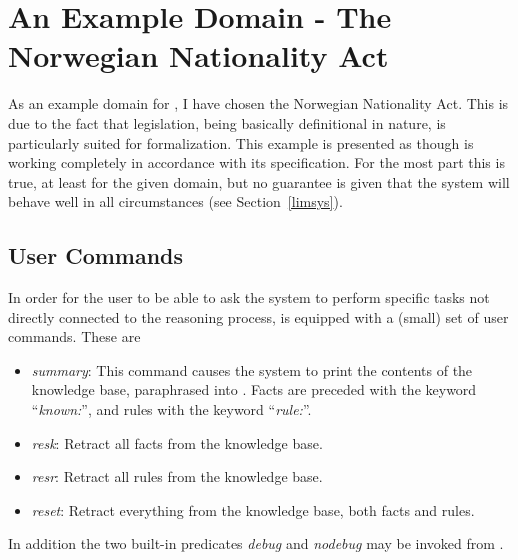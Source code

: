 
\section{An Example Domain - The Norwegian Nationality Act}
\label{example}

As an example domain for {\nash}, I have chosen the Norwegian
Nationality Act. This is due to the fact that legislation, being
basically definitional in nature, is particularly suited for
formalization. This example is presented as though {\nash} is working
completely in accordance with its specification. For the most part
this is true, at least for the given domain, but no guarantee is given
that the system will behave well in all circumstances (see
Section~\ref{limsys}).

\subsection{User Commands}

In order for the user to be able to ask the system to perform specific
tasks not directly connected to the reasoning process, {\nash} is
equipped with a (small) set of user commands. These are

\begin{itemize}
\item {\em summary\/}: This command causes the system to print the
  contents of the knowledge base, paraphrased into {\nal}. Facts are
  preceded with the keyword ``{\sl known:\/}'', and rules with the
  keyword ``{\sl rule:\/}''.
\item {\em resk\/}: Retract all facts from the knowledge base.
\item {\em resr\/}: Retract all rules from the knowledge base.
\item {\em reset\/}: Retract everything from the knowledge base, both
  facts and rules.
\end{itemize}
In addition the two built-in predicates {\em debug\/} and {\em
nodebug\/} may be invoked from {\nash}.

